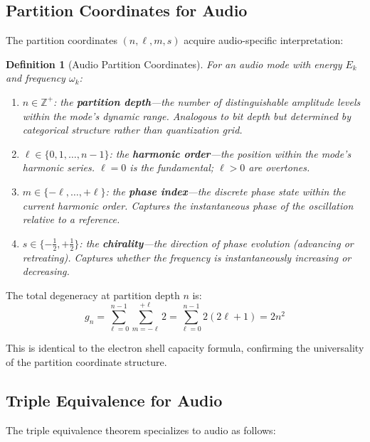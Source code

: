 \documentclass[twocolumn,10pt]{article}
\newtheorem{definition}[theorem]{Definition}
\theoremstyle{remark}
\begin{document}
\subsection{Partition Coordinates for Audio}

The partition coordinates $(n, \ell, m, s)$ acquire audio-specific interpretation:

\begin{definition}[Audio Partition Coordinates]
\label{def:audio_partition}
For an audio mode with energy $E_k$ and frequency $\omega_k$:
\begin{enumerate}
    \item $n \in \mathbb{Z}^+$: the \textbf{partition depth}---the number of distinguishable amplitude levels within the mode's dynamic range. Analogous to bit depth but determined by categorical structure rather than quantization grid.
    \item $\ell \in \{0, 1, \ldots, n-1\}$: the \textbf{harmonic order}---the position within the mode's harmonic series. $\ell = 0$ is the fundamental; $\ell > 0$ are overtones.
    \item $m \in \{-\ell, \ldots, +\ell\}$: the \textbf{phase index}---the discrete phase state within the current harmonic order. Captures the instantaneous phase of the oscillation relative to a reference.
    \item $s \in \{-\tfrac{1}{2}, +\tfrac{1}{2}\}$: the \textbf{chirality}---the direction of phase evolution (advancing or retreating). Captures whether the frequency is instantaneously increasing or decreasing.
\end{enumerate}
\end{definition}

The total degeneracy at partition depth $n$ is:
\begin{equation}
    g_n = \sum_{\ell=0}^{n-1} \sum_{m=-\ell}^{+\ell} 2 = \sum_{\ell=0}^{n-1} 2(2\ell + 1) = 2n^2
    \label{eq:audio_degeneracy}
\end{equation}

This is identical to the electron shell capacity formula, confirming the universality of the partition coordinate structure.

\subsection{Triple Equivalence for Audio}

The triple equivalence theorem \cite{sachikonye2026counting} specializes to audio as follows:
\end{document}
